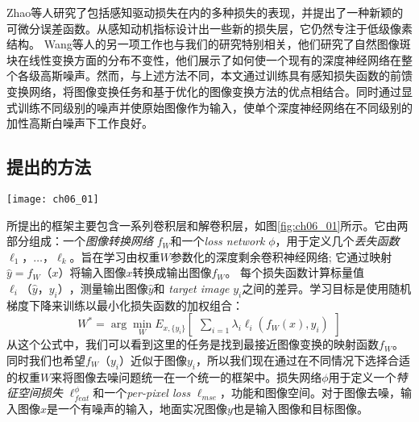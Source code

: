 Zhao等人\cite{Zhao2015}研究了包括感知驱动损失在内的多种损失的表现，并提出了一种新颖的可微分误差函数。从感知动机指标设计出一些新的损失层，它仍然专注于低级像素结构。
Wang等人的另一项工作\cite{Wang2014a}也与我们的研究特别相关，他们研究了自然图像斑块在线性变换方面的分布不变性，他们展示了如何使一个现有的深度神经网络在整个各级高斯噪声。然而，与上述方法不同，本文通过训练具有感知损失函数的前馈变换网络，将图像变换任务和基于优化的图像变换方法的优点相结合。同时通过显式训练不同级别的噪声并使原始图像作为输入，使单个深度神经网络在不同级别的加性高斯白噪声下工作良好。

\subsection{提出的方法} 

\label{sec:method}
\begin{figure*}
\vspace{-6mm}
\centering
\texttt{[image: ch06\_01]}
\caption[提出网络的整体架构图]{我们提出的网络的整体架构。图像变换网络包含卷积（编码器）和解卷积（解码器）层。我们使用预先训练的图像分类的损失网络来定义感知损失函数，这些函数测量输出和地面真实标签的感知差异。损失网络在训练过程中保持不变。}
\label{fig:ch06_01}
\vspace{-10mm}
\end{figure*}
 
所提出的框架主要包含一系列卷积层和解卷积层，如图\ref{fig:ch06_01}所示。它由两部分组成：一个\emph {图像转换网络} $ f_W $和一个\emph{loss network} $ \phi $，用于定义几个\emph {丢失函数} $ \ell_1，\ldots，\ell_k$。旨在学习由权重$ W $参数化的深度剩余卷积神经网络; 它通过映射$ \hat y = f_W（x）$将输入图像$ x $转换成输出图像$ f_W $。
每个损失函数计算标量值$ \ell_i（\hat y，y_i）$，测量输出图像$ \hat y $和 \emph{target image} $ y_i $之间的差异。学习目标是使用随机梯度下降来训练以最小化损失函数的加权组合：
\begin{equation}
   W^* = \arg\min_W E_{x, \{y_i\}}\begin{bmatrix}
\sum_{i=1} \lambda_i \ell_i(f_W(x), y_i)
\end{bmatrix}
\end{equation}
从这个公式中，我们可以看到这里的任务是找到最接近图像变换的映射函数$ f_W $。同时我们也希望$ f_W（y_i）$近似于图像$ y_i $，所以我们现在通过在不同情况下选择合适的权重$ W $来将图像去噪问题统一在一个统一的框架中。损失网络$ \phi $用于定义一个\emph{特征空间损失} $ \ell_{feat}^\phi $和一个\emph{per-pixel loss} $ \ell_{mse} $，功能和图像空间。对于图像去噪，输入图像$ x $是一个有噪声的输入，地面实况图像$ y $也是输入图像和目标图像。
  
